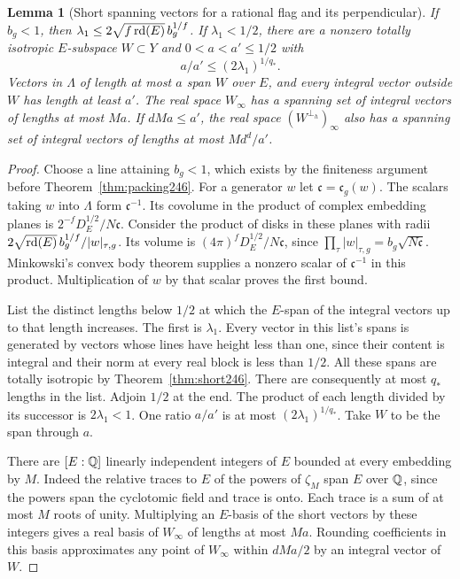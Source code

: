 \documentclass[a4paper,11pt]{article}
\newtheorem{lemma}[proposition]{Lemma}
\theoremstyle{definition}
\theoremstyle{remark}
\numberwithin{equation}{section}
\begin{document}
\begin{lemma}[Short spanning vectors for a rational flag and its perpendicular]
\label{lem:lattices247}
If \(b_g<1\), then
\(\lambda_1\le2\sqrt{f\,{\rm rd}(E)}\,b_g^{1/f}\).
If \(\lambda_1<1/2\), there are a nonzero totally isotropic
\(E\)-subspace \(W\subset Y\) and \(0<a<a'\le1/2\) with
\[
          a/a'\le(2\lambda_1)^{1/q_*}.
\]
Vectors in \(\Lambda\) of length at most \(a\) span \(W\) over
\(E\), and every integral vector outside \(W\) has length at least
\(a'\). The real space \(W_\infty\) has a spanning set of integral
vectors of lengths at most \(Ma\). If \(dMa\le a'\), the real
space \((W^{\perp_h})_\infty\) also has a spanning set of integral
vectors of lengths at most \(Md^d/a'\).
\end{lemma}
\begin{proof}
Choose a line attaining \(b_g<1\), which exists by the finiteness
argument before Theorem~\ref{thm:packing246}. For a generator \(w\)
let \(\mathfrak c=\mathfrak c_g(w)\). The scalars taking \(w\) into
\(\Lambda\) form \(\mathfrak c^{-1}\). Its covolume in the product of
complex embedding planes is \(2^{-f}D_E^{1/2}/N\mathfrak c\).
Consider the product of disks in these planes with radii
\(2\sqrt{{\rm rd}(E)}\,b_g^{1/f}/|w|_{\tau,g}\).
Its volume is \((4\pi)^fD_E^{1/2}/N\mathfrak c\), since
\(\prod_\tau|w|_{\tau,g}=b_g\sqrt{N\mathfrak c}\).
Minkowski's convex body theorem supplies a nonzero scalar of
\(\mathfrak c^{-1}\) in this product. Multiplication of \(w\)
by that scalar proves the first bound.

List the distinct lengths below \(1/2\) at which the \(E\)-span
of the integral vectors up to that length increases. The first is
\(\lambda_1\). Every vector in this list's spans is generated by
vectors whose lines have height less than one, since their content
is integral and their norm at every real block is less than \(1/2\).
All these spans are totally isotropic by Theorem~\ref{thm:short246}.
There are consequently at most \(q_*\) lengths in the list. Adjoin
\(1/2\) at the end. The product of each length divided by its
successor is \(2\lambda_1<1\). One ratio \(a/a'\) is at most
\((2\lambda_1)^{1/q_*}\). Take \(W\) to be the span through \(a\).

There are \([E:\mathbb Q]\) linearly independent integers of \(E\)
bounded at every embedding by \(M\). Indeed the relative traces to
\(E\) of the powers of \(\zeta_M\) span \(E\) over \(\mathbb Q\), since the
powers span the cyclotomic field and trace is onto. Each trace is a
sum of at most \(M\) roots of unity. Multiplying an \(E\)-basis
of the short vectors by these integers gives a real basis of
\(W_\infty\) of lengths at most \(Ma\). Rounding coefficients in
this basis approximates any point of \(W_\infty\) within \(dMa/2\)
by an integral vector of \(W\).


\end{proof}
\end{document}
